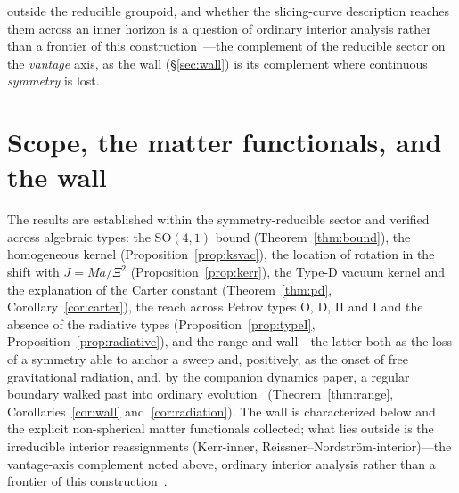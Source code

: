 \documentclass[11pt,a4paper]{article}
\theoremstyle{definition}
\newcommand{\so}{\mathrm{SO}(4,1)}
\begin{document}
outside the reducible groupoid, and whether the slicing-curve description reaches them across an
inner horizon is a question of ordinary interior analysis rather than a frontier of this construction~\cite{JanzenCRframework}---the complement of the reducible sector on the \emph{vantage} axis, as the wall (\S\ref{sec:wall}) is its complement where continuous \emph{symmetry} is lost.

\section{Scope, the matter functionals, and the wall}\label{sec:open}

The results are established within the symmetry-reducible sector and verified across algebraic types: the $\so$ bound (Theorem~\ref{thm:bound}), the homogeneous kernel (Proposition~\ref{prop:ksvac}), the location of rotation in the shift with $J=Ma/\Xi^{2}$ (Proposition~\ref{prop:kerr}), the Type-D vacuum kernel and the explanation of the Carter constant (Theorem~\ref{thm:pd}, Corollary~\ref{cor:carter}), the reach across Petrov types O, D, II and I and the absence of the radiative types (Proposition~\ref{prop:typeI}, Proposition~\ref{prop:radiative}), and the range and wall---the latter both as the loss of a symmetry able to anchor a sweep and, positively, as the onset of free gravitational radiation, and, by the companion dynamics paper, a regular boundary walked past into ordinary evolution~\cite{JanzenDynamics} (Theorem~\ref{thm:range}, Corollaries~\ref{cor:wall} and~\ref{cor:radiation}). The wall is characterized below and the explicit non-spherical matter functionals collected; what lies outside is the irreducible interior reassignments (Kerr-inner, Reissner--Nordstr\"om-interior)---the vantage-axis complement noted above, ordinary interior analysis rather than a frontier of this construction~\cite{JanzenCRframework}.
\end{document}

